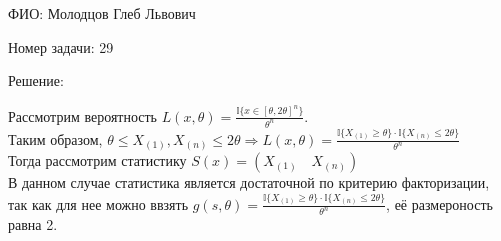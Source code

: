 \documentclass[14pt]{extarticle}
\begin{document}
ФИО: Молодцов Глеб Львович

\vspace{10pt}

Номер задачи: 29

\vspace{10pt}

Решение:

\vspace{10pt}

Рассмотрим вероятность $L(x, \theta) = \frac{\mathbb{I}\{x \in [\theta, 2\theta]^n\}}{\theta^n}$. \\
Таким образом, $\theta \leq X_{(1)} , X_{(n)} \leq 2\theta \Rightarrow L(x, \theta) = \frac{\mathbb{I}\{X_{(1)} \geq \theta\}\cdot \mathbb{I}\{X_{(n)} \leq 2\theta\}}{\theta^n}$ \\
Тогда рассмотрим статистику $S(x) = \left(X_{\left(1\right)}\quad X_{\left(n\right)}\right) $ \\
В данном случае статистика является достаточной по критерию факторизации, так как для нее можно ввзять $g(s, \theta) = \frac{\mathbb{I}\{X_{(1)} \geq \theta\}\cdot \mathbb{I}\{X_{(n)} \leq 2\theta\}}{\theta^n}$, её размероность равна 2.
\end{document}
